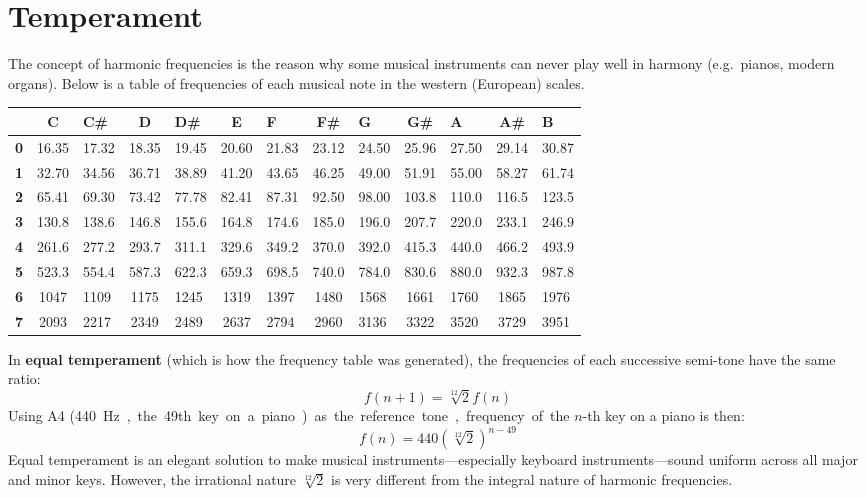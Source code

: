 \section{Temperament}

The concept of harmonic frequencies is the reason why some musical instruments
can never play well in harmony (e.g.\ pianos, modern organs). Below is a table
of frequencies of each musical note in the western (European) scales.

\begin{table}[ht]
  \centering
  {\footnotesize
    \begin{tabular}{g||c|g|c|g|c|g|c|g|c|g|c|g}
      & C & C\# & D & D\# & E & F & F\# & G & G\# & A & A\# & B\\
      \hline\hline
      \textbf{0} & 16.35 & 17.32 & 18.35 & 19.45 & 20.60 & 21.83 & 23.12 &
      24.50 & 25.96 & 27.50 & 29.14 & 30.87 \\ \hline
      \textbf{1} & 32.70 & 34.56 & 36.71 & 38.89 & 41.20 & 43.65 & 46.25 &
      49.00 & 51.91 & 55.00 & 58.27 & 61.74 \\ \hline
      \textbf{2} & 65.41 & 69.30 & 73.42 & 77.78 & 82.41 & 87.31 & 92.50 &
      98.00 & 103.8 & 110.0 & 116.5 & 123.5 \\ \hline
      \textbf{3} & 130.8 & 138.6 & 146.8 & 155.6 & 164.8 & 174.6 & 185.0 &
      196.0 & 207.7 & 220.0 & 233.1 & 246.9 \\ \hline
      \textbf{4} & 261.6 & 277.2 & 293.7 & 311.1 & 329.6 & 349.2 & 370.0 &
      392.0 & 415.3 & 440.0 & 466.2 & 493.9 \\ \hline
      \textbf{5} & 523.3 & 554.4 & 587.3 & 622.3 & 659.3 & 698.5 & 740.0 &
      784.0 & 830.6 & 880.0 & 932.3 & 987.8 \\ \hline
      \textbf{6} & 1047 & 1109 & 1175 & 1245 & 1319 & 1397 & 1480 & 1568 &
      1661 & 1760 & 1865 & 1976 \\ \hline
      \textbf{7} & 2093 & 2217 & 2349 & 2489 & 2637 & 2794 & 2960 & 3136 &
      3322 & 3520 & 3729 & 3951
    \end{tabular}
  }
\end{table}
In \textbf{equal temperament} (which is how the frequency table was generated),
the frequencies of each successive semi-tone have the same ratio:
\begin{equation}
  \boxed{f(n+1)=\sqrt[12]2f(n)}
\end{equation}
Using A4 (\SI{440}\hertz, the 49th key on a piano) as the
reference tone, frequency of the $n$-th key on a piano is then:
\begin{equation}
  \boxed{f(n)=440(\sqrt[12]2)^{n-49}}
\end{equation}
Equal temperament is an elegant solution to make musical
instruments---especially keyboard instruments---sound uniform across all major
and minor keys. However, the irrational nature $\sqrt[12]2$ is very different
from the integral nature of harmonic frequencies.

